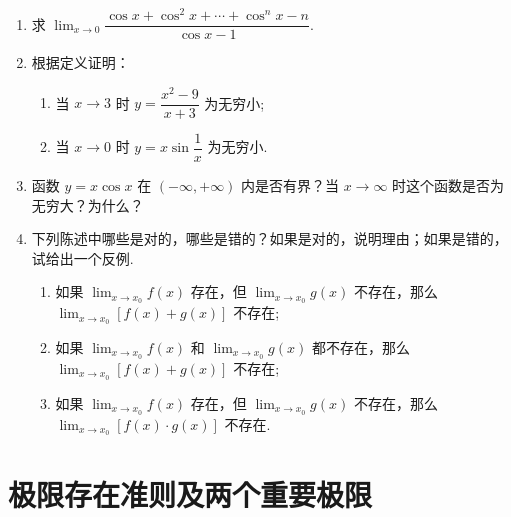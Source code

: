 \begin{enumerate}
    \item  求 $\displaystyle\lim_{x\to0}\dfrac{\cos x+\cos^2x+\cdots+\cos^n x-n}{\cos x-1}$.
    
    \item 根据定义证明：
    \begin{enumerate}[(1)]\setlength{\itemsep}{5pt}\setlength{\topsep}{15pt}
        \item 当 $x \to 3$ 时 $y=\dfrac{x^2-9}{x+3}$ 为无穷小;
        \item 当 $x \to 0$ 时 $y=x\sin\dfrac{1}{x}$ 为无穷小.
    \end{enumerate}
    
    \item 函数 $y=x\cos x$ 在 $(-\infty, +\infty)$ 内是否有界？当 $x\to\infty$ 时这个函数是否为无穷大？为什么？
    
    \item 下列陈述中哪些是对的，哪些是错的？如果是对的，说明理由；如果是错的，试给出一个反例.
    \begin{enumerate}[(1)]\setlength{\itemsep}{5pt}\setlength{\topsep}{15pt}
        \item 如果 $\displaystyle\lim_{x\to x_0}f(x)$ 存在，但 $\displaystyle\lim_{x\to x_0}g(x)$ 不存在，那么 $\displaystyle\lim_{x\to x_0}[f(x)+g(x)]$ 不存在;
        \item 如果 $\displaystyle\lim_{x\to x_0}f(x)$ 和 $\displaystyle\lim_{x\to x_0}g(x)$ 都不存在，那么 $\displaystyle\lim_{x\to x_0}[f(x)+g(x)]$ 不存在;
        \item 如果 $\displaystyle\lim_{x\to x_0}f(x)$ 存在，但 $\displaystyle\lim_{x\to x_0}g(x)$ 不存在，那么 $\displaystyle\lim_{x\to x_0}[f(x) \cdot g(x)]$ 不存在.
    \end{enumerate}

\end{enumerate}

\section{极限存在准则及两个重要极限}

